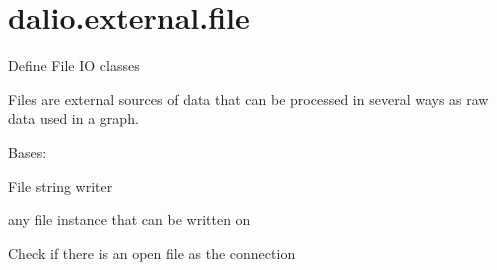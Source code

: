 \documentclass[letterpaper,10pt,english]{sphinxmanual}
\begin{document}
\section{dalio.external.file}
\label{\detokenize{dalio.external:module-dalio.external.file}}\label{\detokenize{dalio.external:dalio-external-file}}
Define File IO classes

Files are external sources of data that can be processed in several ways as
raw data used in a graph.

\begin{fulllineitems}
\label{\detokenize{dalio.external:dalio.external.file.FileWriter}}
Bases: {\hyperref[\detokenize{dalio.external:dalio.external.external.External}]{}}

File string writer

\begin{fulllineitems}
\label{\detokenize{dalio.external:dalio.external.file.FileWriter._connection}}
any file instance that can be written on

\end{fulllineitems}


\begin{fulllineitems}
\label{\detokenize{dalio.external:dalio.external.file.FileWriter.check}}
Check if there is an open file as the connection

\end{fulllineitems}


\end{fulllineitems}
\end{document}
